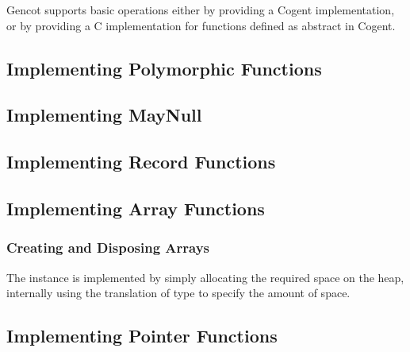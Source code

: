 Gencot supports basic operations either by providing a Cogent implementation, or by providing
a C implementation for functions defined as abstract in Cogent.

\subsection{Implementing Polymorphic Functions}
\label{impl-operations-poly}

\subsection{Implementing MayNull}
\label{impl-operations-null}

\subsection{Implementing Record Functions}
\label{impl-operations-record}

\subsection{Implementing Array Functions}
\label{impl-operations-array}

\subsubsection{Creating and Disposing Arrays}

The  instance is implemented by simply allocating the
required space on the heap, internally using the translation of type  to specify
the amount of space. 

\subsection{Implementing Pointer Functions}
\label{impl-operations-pointer}

